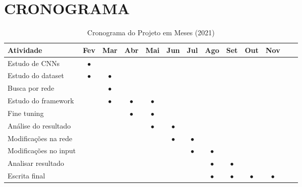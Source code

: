 \documentclass[12pt,a4paper]{article}
\begin{document}
		\section{CRONOGRAMA}
		\begin{table}[htbp]
			\centering
			\caption{Cronograma do Projeto em Meses (2021)}
			\label{tab:cronograma}
			\begin{tabular}{lcccccccccccc} %
				\toprule
				\textbf{Atividade} & \textbf{Fev} & \textbf{Mar} & \textbf{Abr} & \textbf{Mai} & \textbf{Jun} & \textbf{Jul} & \textbf{Ago} & \textbf{Set} & \textbf{Out} & \textbf{Nov} \\
				\midrule
				Estudo de CNNs & $\bullet$\\
				Estudo do dataset & $\bullet$ & $\bullet$\\
				Busca por rede & & $\bullet$\\
				Estudo do framework & & $\bullet$ & $\bullet$ & $\bullet$\\
				Fine tuning & & & $\bullet$ & $\bullet$\\
				Análise do resultado & & & & $\bullet$ & $\bullet$\\
				Modificações na rede & & & & & $\bullet$ & $\bullet$\\
				Modificações no input & & & & & & $\bullet$ & $\bullet$\\
				Analisar resultado & & & & & & & $\bullet$ & $\bullet$\\
				Escrita final & & & & & & & $\bullet$ & $\bullet$ & $\bullet$ & $\bullet$\\
				\bottomrule
			\end{tabular}%
		\end{table}
	
\end{document}
